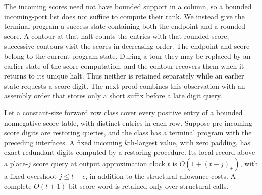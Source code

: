 The incoming scores need not have bounded support in a column, so a
bounded incoming-port list does not suffice to compute their rank.  We
instead give the terminal program a success state containing both the
endpoint and a rounded score.  A contour at that halt counts the
entries with that rounded score; successive contours visit the scores
in decreasing order.  The endpoint and score belong to the current
program state.  During a tour they may be replaced by an earlier state
of the score computation, and the contour recovers them when it returns
to its unique halt.  Thus neither is retained separately while an
earlier state requests a score digit.  The next proof combines this
observation with an assembly order that stores only a short suffix
before a late digit query.

\begin{lemma}\label{lem:ctrl-score-rank}
Let a constant-size forward row class cover every positive entry of a
bounded nonnegative score table, with distinct entries in each row.
Suppose pre-incoming score digits are restoring queries, and the class
has a terminal program with the preceding interfaces.  A fixed incoming
$k$th-largest value, with zero padding, has exact redundant digits computed
by a restoring procedure.  Its local record above a place-$j$ score
query at output approximation clock $t$ is $O(1+(t-j)_+)$, with a fixed
overshoot $j\le t+c$, in addition to
the structural allowance costs.  A complete $O(t+1)$-bit score word is
retained only over structural calls.
\end{lemma}

